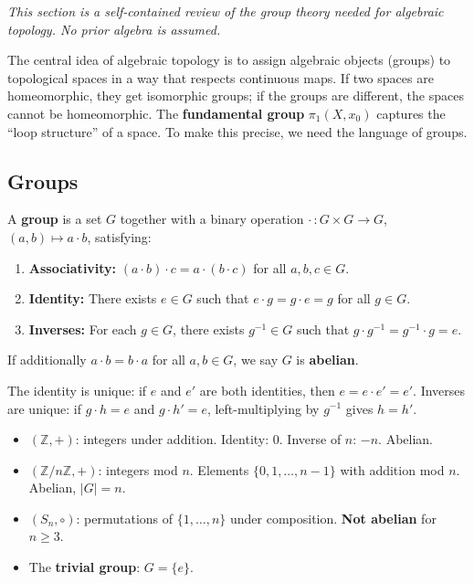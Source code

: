 \documentclass[11pt]{report}
\begin{document}
\textit{This section is a self-contained review of the group theory needed for algebraic topology. No prior algebra is assumed.}

\begin{rembox}
The central idea of algebraic topology is to assign algebraic objects (groups) to topological spaces in a way that respects continuous maps. If two spaces are homeomorphic, they get isomorphic groups; if the groups are different, the spaces cannot be homeomorphic. The \textbf{fundamental group} $\pi_1(X, x_0)$ captures the ``loop structure'' of a space. To make this precise, we need the language of groups.
\end{rembox}

\subsection{Groups}

\begin{defbox}[Group]
A \textbf{group} is a set $G$ together with a binary operation $\cdot\,: G \times G \to G$, $(a, b) \mapsto a \cdot b$, satisfying:
\begin{enumerate}
    \item \textbf{Associativity:} $(a \cdot b) \cdot c = a \cdot (b \cdot c)$ for all $a, b, c \in G$.
    \item \textbf{Identity:} There exists $e \in G$ such that $e \cdot g = g \cdot e = g$ for all $g \in G$.
    \item \textbf{Inverses:} For each $g \in G$, there exists $g^{-1} \in G$ such that $g \cdot g^{-1} = g^{-1} \cdot g = e$.
\end{enumerate}
If additionally $a \cdot b = b \cdot a$ for all $a, b \in G$, we say $G$ is \textbf{abelian}.
\end{defbox}

\begin{rembox}
The identity is unique: if $e$ and $e'$ are both identities, then $e = e \cdot e' = e'$. Inverses are unique: if $g \cdot h = e$ and $g \cdot h' = e$, left-multiplying by $g^{-1}$ gives $h = h'$.
\end{rembox}

\begin{exbox}
\begin{itemize}[nosep]
    \item $(\mathbb{Z}, +)$: integers under addition. Identity: $0$. Inverse of $n$: $-n$. Abelian.
    \item $(\mathbb{Z}/n\mathbb{Z}, +)$: integers mod $n$. Elements $\{0, 1, \ldots, n-1\}$ with addition mod $n$. Abelian, $|G| = n$.
    \item $(S_n, \circ)$: permutations of $\{1, \ldots, n\}$ under composition. \textbf{Not abelian} for $n \geq 3$.
    \item The \textbf{trivial group}: $G = \{e\}$.
\end{itemize}
\end{exbox}
\end{document}
